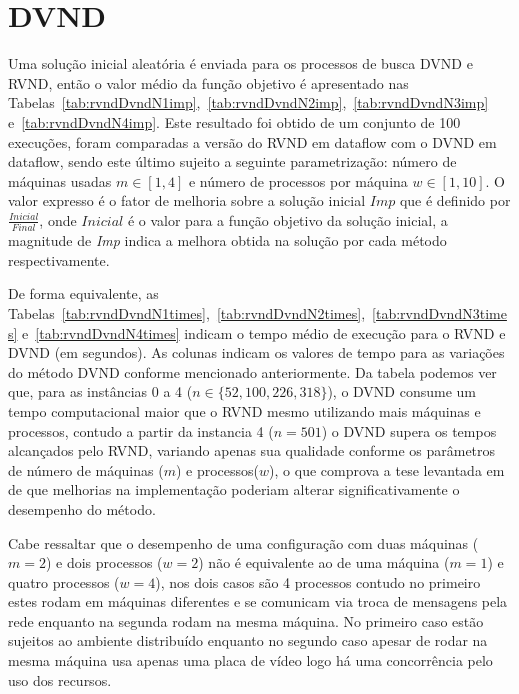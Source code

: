 \section{DVND} \label{sec:res_df_dvnd}

Uma solução inicial aleatória é enviada para os processos de busca DVND e RVND, então o valor médio da função objetivo é apresentado nas Tabelas~\ref{tab:rvndDvndN1imp},~\ref{tab:rvndDvndN2imp},~\ref{tab:rvndDvndN3imp} e~\ref{tab:rvndDvndN4imp}.
Este resultado foi obtido de um conjunto de 100 execuções, foram comparadas a versão do RVND em dataflow com o DVND em dataflow, sendo este último sujeito a seguinte parametrização: número de máquinas usadas $m \in [1, 4]$ e número de processos por máquina $w \in [1, 10]$.
O valor expresso é o fator de melhoria sobre a solução inicial $Imp$ que é definido por $\frac{Inicial}{Final}$, onde $Inicial$ é o valor para a função objetivo da solução inicial, a magnitude de \textit{Imp} indica a melhora obtida na solução por cada método respectivamente.



De forma equivalente, as Tabelas~\ref{tab:rvndDvndN1times},~\ref{tab:rvndDvndN2times},~\ref{tab:rvndDvndN3times} e~\ref{tab:rvndDvndN4times} indicam o tempo médio de execução para o RVND e DVND (em segundos).
As colunas indicam os valores de tempo para as variações do método DVND conforme mencionado anteriormente.
Da tabela podemos ver que, para as instâncias 0 a 4 ($n \in \{52, 100, 226, 318\}$), o DVND consume um tempo computacional maior que o RVND mesmo utilizando mais máquinas e processos, contudo a partir da instancia 4 ($n=501$) o DVND supera os tempos alcançados pelo RVND, variando apenas sua qualidade conforme os parâmetros de número de máquinas ($m$) e processos($w$), o que comprova a tese levantada em~\cite{df-dvnd2018} de que melhorias na implementação poderiam alterar significativamente o desempenho do método.

Cabe ressaltar que o desempenho de uma configuração com duas máquinas ($m=2$) e dois processos ($w=2$) não é equivalente ao de uma máquina ($m=1$) e quatro processos ($w=4$), nos dois casos são 4 processos contudo no primeiro estes rodam em máquinas diferentes e se comunicam via troca de mensagens pela rede enquanto na segunda rodam na mesma máquina.
No primeiro caso estão sujeitos ao ambiente distribuído enquanto no segundo caso apesar de rodar na mesma máquina usa apenas uma placa de vídeo logo há uma concorrência pelo uso dos recursos.

